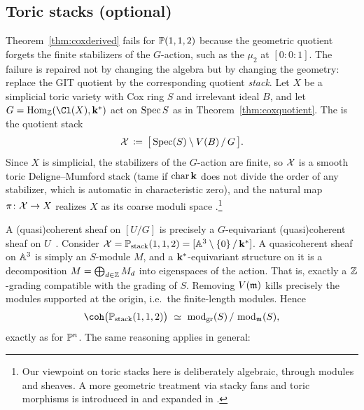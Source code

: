 \documentclass{amsart}
\begin{document}



\subsection{Toric stacks (optional)}

Theorem~\ref{thm:coxderived} fails for $\mathbb P(1,1,2)$ because the geometric quotient forgets the finite stabilizers of the $G$-action, such as the $\mu_2$ at $[0:0:1]$. The failure is repaired not by changing the algebra but by changing the geometry: replace the GIT quotient by the corresponding quotient \emph{stack}. Let $X$ be a simplicial toric variety with Cox ring $S$ and irrelevant ideal $B$, and let $G = \Hom_\ZZ(\Cl(X),\kk^*)$ act on $\operatorname{Spec} S$ as in Theorem~\ref{thm:coxquotient}. The  is the quotient stack
\[ \mathcal X \,\coloneqq\, \bigl[\,\operatorname{Spec}(S)\setminus V(B)\,/\,G\,\bigr]. \]
Since $X$ is simplicial, the stabilizers of the $G$-action are finite, so $\mathcal X$ is a smooth toric Deligne--Mumford stack (tame if $\operatorname{char}{\bf k}$ does not divide the order of any stabilizer, which is automatic in characteristic zero), and the natural map $\pi\colon\mathcal X\to X$ realizes $X$ as its coarse moduli space \cite{BCS05}.\footnote{Our viewpoint on toric stacks here is deliberately algebraic, through modules and sheaves. A more geometric treatment via stacky fans and toric morphisms is introduced in \cite{BCS05} and expanded in \cites{GS15a,GS15b}.}

A (quasi)coherent sheaf on $[U/G]$ is precisely a $G$-equivariant (quasi)coherent sheaf on $U$~\cite[Ex.~7.21]{Vistoli89}. Consider $\mathcal X = \mathbb P_{\mathrm{stack}}(1,1,2) = [\mathbb A^3\setminus\{0\}\,/\,{\bf k}^*]$. A quasicoherent sheaf on $\mathbb A^3$ is simply an $S$-module $M$, and a ${\bf k}^*$-equivariant structure on it is a decomposition $M = \bigoplus_{d\in\mathbb Z} M_d$ into eigenspaces of the action. That is, exactly a $\mathbb Z$-grading compatible with the grading of $S$. Removing $V(\mathfrak m)$ kills precisely the modules supported at the origin, i.e.\ the finite-length modules. Hence
\[ \coh\bigl(\PP_{\mathrm{stack}}(1,1,2)\bigr)\ \simeq\ \operatorname{mod}_{\mathrm{gr}}(S)\,/\,\operatorname{mod}_{\m}(S), \]
exactly as for $\mathbb P^n$. The same reasoning applies in general:
\end{document}
